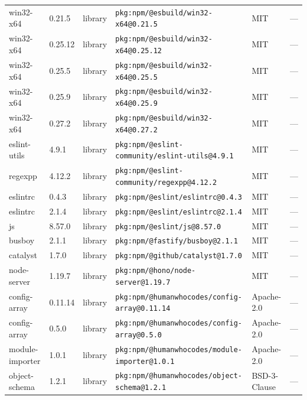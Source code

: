 \documentclass[11pt,a4paper]{article}
\begin{document}
\begin{longtable}{|p{4cm}|p{2cm}|p{1.6cm}|p{5cm}|p{1.5cm}|p{3.5cm}|}
\raggedright win32-x64 & 0.21.5 & library & \small\texttt{pkg:npm/@esbuild/win32-x64@0.21.5} & MIT & \small — \\
\raggedright win32-x64 & 0.25.12 & library & \small\texttt{pkg:npm/@esbuild/win32-x64@0.25.12} & MIT & \small — \\
\raggedright win32-x64 & 0.25.5 & library & \small\texttt{pkg:npm/@esbuild/win32-x64@0.25.5} & MIT & \small — \\
\raggedright win32-x64 & 0.25.9 & library & \small\texttt{pkg:npm/@esbuild/win32-x64@0.25.9} & MIT & \small — \\
\raggedright win32-x64 & 0.27.2 & library & \small\texttt{pkg:npm/@esbuild/win32-x64@0.27.2} & MIT & \small — \\
\raggedright eslint-utils & 4.9.1 & library & \small\texttt{pkg:npm/@eslint-community/eslint-utils@4.9.1} & MIT & \small — \\
\raggedright regexpp & 4.12.2 & library & \small\texttt{pkg:npm/@eslint-community/regexpp@4.12.2} & MIT & \small — \\
\raggedright eslintrc & 0.4.3 & library & \small\texttt{pkg:npm/@eslint/eslintrc@0.4.3} & MIT & \small — \\
\raggedright eslintrc & 2.1.4 & library & \small\texttt{pkg:npm/@eslint/eslintrc@2.1.4} & MIT & \small — \\
\raggedright js & 8.57.0 & library & \small\texttt{pkg:npm/@eslint/js@8.57.0} & MIT & \small — \\
\raggedright busboy & 2.1.1 & library & \small\texttt{pkg:npm/@fastify/busboy@2.1.1} & MIT & \small — \\
\raggedright catalyst & 1.7.0 & library & \small\texttt{pkg:npm/@github/catalyst@1.7.0} & MIT & \small — \\
\raggedright node-server & 1.19.7 & library & \small\texttt{pkg:npm/@hono/node-server@1.19.7} & MIT & \small — \\
\raggedright config-array & 0.11.14 & library & \small\texttt{pkg:npm/@humanwhocodes/config-array@0.11.14} & Apache-2.0 & \small — \\
\raggedright config-array & 0.5.0 & library & \small\texttt{pkg:npm/@humanwhocodes/config-array@0.5.0} & Apache-2.0 & \small — \\
\raggedright module-importer & 1.0.1 & library & \small\texttt{pkg:npm/@humanwhocodes/module-importer@1.0.1} & Apache-2.0 & \small — \\
\raggedright object-schema & 1.2.1 & library & \small\texttt{pkg:npm/@humanwhocodes/object-schema@1.2.1} & BSD-3-Clause & \small — \\

\end{longtable}
\end{document}

